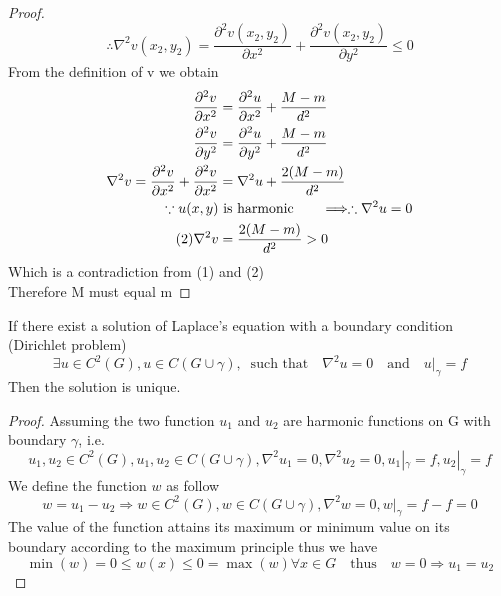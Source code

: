 \documentclass[]{article}
\begin{document}
\begin{proof}
\[    \]
    \setcounter{equation}{0}
    \begin{equation}
        \therefore  \nabla^2 v(x_2,y_2) =  \frac{\partial^2 v(x_2,y_2)}{\partial x^2}+\frac{\partial^2 v(x_2,y_2)}{\partial y^2} \leq 0
    \end{equation}
    From the definition of v we obtain
    \begin{align*}
        \frac{\partial^2 v}{\partial x^2} &= \frac{\partial^2 u}{\partial x^2} + \frac{M-m}{d^2}
        \\
        \frac{\partial^2 v}{\partial y^2} &= \frac{\partial^2 u}{\partial y^2} + \frac{M-m}{d^2}
        \\
        \nabla^2 v = \frac{\partial^2 v}{\partial x^2} + \frac{\partial^2 v}{\partial x^2} &= \nabla^2 u + \frac{2(M-m)}{d^2}
        \\
        \because u(x,y) &\text{ is harmonic}\quad\quad \Longrightarrow \therefore \nabla^2 u = 0
        \\\tag{2}
        \nabla^2 v &= \frac{2(M-m)}{d^2} > 0 
    \end{align*}
    Which is a contradiction from (1) and (2)
    \\
    Therefore M must equal m 
\end{proof}
\begin{theorem}
    If there exist a solution of Laplace's equation 
    with a boundary condition (Dirichlet problem)
    \[
    \exists u \in C^2(G), u \in C(G \cup \gamma),\;\; \text{such that} \quad \nabla^2 u =0 \quad \text{and} \quad u|_\gamma = f
    \]
    Then the solution is unique.
\end{theorem}
\begin{proof}
Assuming the two function $u_1$ and $u_2$ are harmonic functions on G with boundary $\gamma$, i.e. 
\[
    u_1 ,u_2 \in C^2(G), u_1 , u_2 \in C(G \cup \gamma), \nabla^2 u_1 =0, \nabla^2 u_2 =0, u_1|_\gamma = f, u_2|_\gamma = f    
\]
We define the function $w$ as follow
\[
    w = u_1-u_2 \Rightarrow w\in C^2(G), w \in C(G \cup \gamma), \nabla^2 w =0, w|_\gamma = f-f = 0    
\]
The value of the function attains its maximum or minimum value on its boundary according to the maximum principle thus we have
\[
    \min(w) = 0 \leq w(x) \leq 0= \max(w) \forall x \in G \quad \text{thus} \quad w = 0 \Rightarrow u_1 = u_2     
\]
\end{proof}
\end{document}
